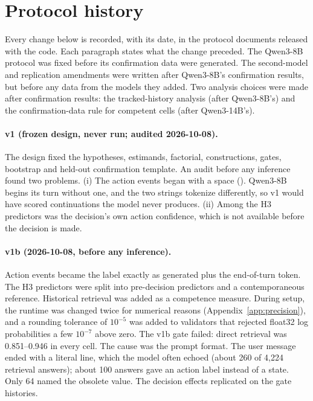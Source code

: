\section{Protocol history}
\label{app:history}

Every change below is recorded, with its date, in the protocol documents released with the code. Each
paragraph states what the change preceded. The Qwen3-8B protocol was fixed before its confirmation data
were generated. The second-model and replication amendments were written after Qwen3-8B's confirmation
results, but before any data from the models they added. Two analysis choices were made after
confirmation results: the tracked-history analysis (after Qwen3-8B's) and the confirmation-data rule for
competent cells (after Qwen3-14B's).

\paragraph{v1 (frozen design, never run; audited 2026-10-08).} The design fixed the hypotheses, estimands, factorial,
constructions, gates, bootstrap and held-out confirmation template. An audit before any inference found
two problems. (i) The action events began with a space (). Qwen3-8B begins
its turn without one, and the two strings tokenize differently, so v1 would have scored continuations the
model never produces. (ii) Among the H3 predictors was the decision's own action confidence, which is not
available before the decision is made.

\paragraph{v1b (2026-10-08, before any inference).} Action events became the label exactly as generated plus the
end-of-turn token. The H3 predictors were split into pre-decision predictors and a contemporaneous
reference. Historical retrieval was added as a competence measure. During setup, the runtime was changed
twice for numerical reasons (Appendix~\ref{app:precision}), and a rounding tolerance of $10^{-5}$ was added
to validators that rejected float32 log probabilities a few $10^{-7}$ above zero. The v1b gate failed:
direct retrieval was 0.851--0.946 in every cell. The cause was the prompt format. The user message ended
with a literal  line, which the model often echoed (about 260 of 4{,}224 retrieval answers);
about 100 answers gave an action label instead of a state. Only 64 named the obsolete value. The decision
effects replicated on the gate histories.

